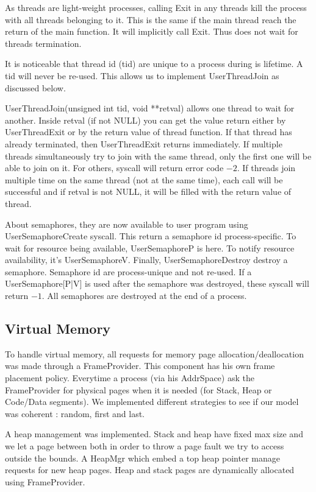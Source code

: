 As threads are light-weight processes, calling \textrm{Exit} in any threads kill the
process with all threads belonging to it. This is the same if the main thread
reach the return of the main function. It will implicitly call \textrm{Exit}. Thus does
not wait for threads termination.

It is noticeable that thread id (tid) are unique to a process during is
lifetime. A tid will never be re-used. This allows us to implement
\textrm{UserThreadJoin} as discussed below.

\textrm{UserThreadJoin(unsigned int tid, void **retval)} allows one thread to wait for
another. Inside retval (if not NULL) you can get the value return either by
\textrm{UserThreadExit} or by the return value of thread function. If that thread has
already terminated, then \textrm{UserThreadExit} returns immediately. If multiple
threads simultaneously try to join with the same thread, only the first one
will be able to join on it. For others, syscall will return error code $-2$. If
threads join multiple time on the same thread (not at the same time), each
call will be successful and if retval is not NULL, it will be filled with the
return value of thread.

About semaphores, they are now available to user program using
UserSemaphoreCreate syscall. This return a semaphore id process-specific. To
wait for resource being available, \textrm{UserSemaphoreP} is here. To notify resource
availability, it's\textrm{ UserSemaphoreV}. Finally,\textrm{ UserSemaphoreDestroy} destroy a
semaphore. Semaphore id are process-unique and not re-used. If a
UserSemaphore[P|V] is used after the semaphore was destroyed, these syscall
will return $-1$. All semaphores are destroyed at the end of a process.

\subsection{Virtual Memory}

To handle virtual memory, all requests for memory page allocation/deallocation
was made through a FrameProvider. This component has his own frame placement
policy. Everytime a process (via his AddrSpace) ask the FrameProvider for
physical pages when it is needed (for Stack, Heap or Code/Data segments).
We implemented different strategies to see if our model was coherent : random,
first and last.

A heap management was implemented. Stack and heap have fixed max size and
we let a page between both in order to throw a page fault we try to access
outside the bounds. A HeapMgr which embed a top heap pointer manage requests for
new heap pages.
Heap and stack pages are dynamically allocated using FrameProvider.

